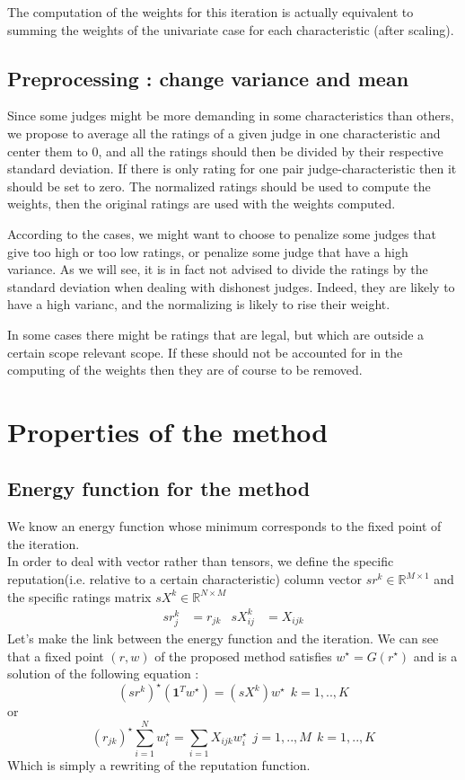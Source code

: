 \documentclass[12pt,a4paper]{article}
\begin{document}
The computation of the weights for this iteration is actually equivalent to summing the weights of the univariate case for each characteristic (after scaling).


\subsection{Preprocessing : change variance and mean}
Since some judges might be more demanding in some characteristics than others, we propose to average all the ratings of a given judge in one characteristic and center them to $0$, and all the ratings should then be divided by their respective standard deviation. If there is only rating for one pair judge-characteristic then it should be set to zero. The normalized ratings should be used to compute the weights, then the original ratings are used with the weights computed.

According to the cases, we might want to choose to penalize some judges that give too high or too low ratings, or penalize some judge that have a high variance. As we will see, it is in fact not advised to divide the ratings by the standard deviation when dealing with dishonest judges. Indeed, they are likely to have a high varianc, and the normalizing is likely to rise their weight.

In some cases there might be ratings that are legal, but which are outside a certain scope relevant scope. If these should not be accounted for in the computing of the weights then they are of course to be removed.


\section{Properties of the method}
\subsection{Energy function for the method}
We know an energy function whose minimum corresponds to the fixed point of the iteration.\\
In order to deal with vector rather than tensors, we define the specific reputation(i.e. relative to a certain characteristic) column vector $ sr^k \in \mathbb{R}^{M\times 1}$ and the specific ratings matrix $sX^k \in \mathbb{R}^{N\times M}$
\begin{align*}
sr^k_{j} &= r_{jk} & sX^k_{ij} &= X_{ijk}
\end{align*}
Let's make the link between the energy function and the iteration. 
We can see that a fixed point $(r,w)$ of the proposed method satisfies $ w^{\star} = G(r^{\star})$ and is a solution of the following equation :
$$ (sr^k)^{\star} (\mathbf{1}^Tw^{\star}) = (sX^k)w^{\star} \:\: k = 1,..,K$$
or 
$$ (r_{jk})^{\star} \sum_{i=1}^N w_i^{\star} = \sum_{i=1} X_{ijk} w_i^{\star} \:\: j = 1,..,M \:\: k = 1,..,K$$
Which is simply a rewriting of the reputation function.
\end{document}
